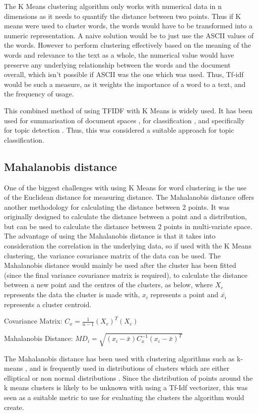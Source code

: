 The K Means clustering algorithm only works with numerical data in n dimensions as it needs to quantify the distance between two points. Thus if K means were used to cluster words, the words would have to be transformed into a numeric representation. A naive solution would be to just use the ASCII values of the words. However to perform clustering effectively based on the meaning of the words and relevance to the text as a whole, the numerical value would have preserve any underlying relationship between the words and the document overall, which isn't possible if ASCII was the one which was used. Thus, Tf-idf would be such a measure, as it weights the importance of a word to a text, and the frequency of usage. 

This combined method of using TFIDF with K Means is widely used. It has been used for summarisation of document spaces \cite{khan2019extractive}, for classification \cite{buana2012combination}, and specifically for topic detection \cite{6066301}. Thus, this was considered a suitable approach for topic classification.

\subsection{Mahalanobis distance}
One of the biggest challenges with using K Means for word clustering is the use of the Euclidean distance for measuring distance. The Mahalanobis distance offers another methodology for calculating the distance between 2 points. It was originally designed to calculate the distance between a point and a distribution, but can be used to calculate the distance between 2 points in multi-variate space. The advantage of using the Mahalanobis distance is that it takes into consideration the correlation in the underlying data, so if used with the K Means clustering, the variance covariance matrix of the data can be used. The Mahalanobis distance would mainly be used after the cluster has been fitted (since the final variance covariance matrix is required), to calculate the distance between a new point and the centres of the clusters, as below, where $X_{c}$ represents the data the cluster is made with, $x_{i}$ represents a point and $\bar{x_{i}}$ represents a cluster centroid.  

\begin{center}
	Covariance Matrix:
	$C_{x} = \frac{1}{n - 1} (X_{c}) ^T (X_{c})$
	
	Mahalanobis Distance:
	$MD_{i} = \sqrt{(x_{i}  -  \bar{ x  } ) C_{x}^{-1} ( x_{i}   - \bar{ x  }  )^T    }  $
\end{center}

The Mahalanobis distance has been used with clustering algorithms such as k-means \cite{melnykov2014k} \cite{cerioli2005k}, and is frequently used in distributions of clusters which are either elliptical \cite{mitchell1985mahalanobis} or non normal distributions \cite{warren2011use}. Since the distribution of points around the k means clusters is likely to be unknown with using a Tf-Idf vectorizer, this was seen as a suitable metric to use for evaluating the clusters the algorithm would create.